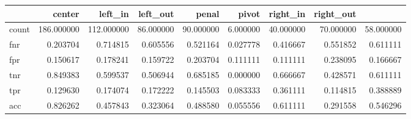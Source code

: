 \begin{tabular}{lrrrrrrrr}
\toprule
{} &      center &    left\_in &   left\_out &     penal &      pivot &   right\_in &  right\_out \\
\midrule
count &  186.000000 &  112.000000 &  86.000000 &  90.000000 &  6.000000 &  40.000000 &  70.000000 &  58.000000 \\
fnr   &    0.203704 &    0.714815 &   0.605556 &   0.521164 &  0.027778 &   0.416667 &   0.551852 &   0.611111 \\
fpr   &    0.150617 &    0.178241 &   0.159722 &   0.203704 &  0.111111 &   0.111111 &   0.238095 &   0.166667 \\
tnr   &    0.849383 &    0.599537 &   0.506944 &   0.685185 &  0.000000 &   0.666667 &   0.428571 &   0.611111 \\
tpr   &    0.129630 &    0.174074 &   0.172222 &   0.145503 &  0.083333 &   0.361111 &   0.114815 &   0.388889 \\
acc   &    0.826262 &    0.457843 &   0.323064 &   0.488580 &  0.055556 &   0.611111 &   0.291558 &   0.546296 \\
\bottomrule
\end{tabular}

